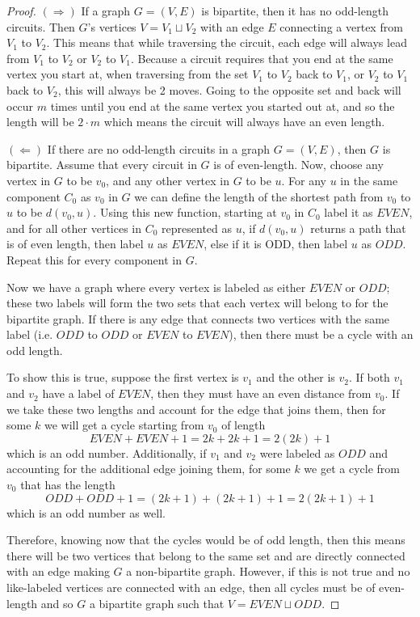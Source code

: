 \documentclass[11pt]{article}
\begin{document}
\begin{proof}
	$(\Longrightarrow)$ If a graph $G=(V,E)$ is bipartite, then it has no odd-length circuits. Then $G$'s vertices $V=V_1 \sqcup V_2$ with an edge $E$ connecting a vertex from $V_1$ to $V_2$. This means that while traversing the circuit, each edge will always lead from $V_1$ to $V_2$ or $V_2$ to $V_1$. Because a circuit requires that you end at the same vertex you start at, when traversing from the set $V_1$ to $V_2$ back to $V_1$, or $V_2$ to $V_1$ back to $V_2$, this will always be 2 moves. Going to the opposite set and back will occur $m$ times until you end at the same vertex you started out at, and so the length will be $2\cdot m$ which means the circuit will always have an even length.

	$(\Longleftarrow)$ If there are no odd-length circuits in a graph $G=(V,E)$, then $G$ is bipartite. Assume that every circuit in $G$ is of even-length. Now, choose any vertex in $G$ to be $v_0$, and any other vertex in $G$ to be $u$. For any $u$ in the same component $C_0$ as $v_0$ in $G$ we can define the length of the shortest path from $v_0$ to $u$ to be $d(v_0,u)$. Using this new function, starting at $v_0$ in $C_0$ label it as $EVEN$, and for all other vertices in $C_0$ represented as $u$, if $d(v_0, u)$ returns a path that is of even length, then label $u$ as $EVEN$, else if it is ODD, then label $u$ as $ODD$. Repeat this for every component in $G$. 

	Now we have a graph where every vertex is labeled as either $EVEN$ or $ODD$; these two labels will form the two sets that each vertex will belong to for the bipartite graph. If there is any edge that connects two vertices with the same label (i.e. $ODD$ to $ODD$ or $EVEN$ to $EVEN$), then there must be a cycle with an odd length. 

	To show this is true, suppose the first vertex is $v_1$ and the other is $v_2$. If both $v_1$ and $v_2$ have a label of $EVEN$, then they must have an even distance from $v_0$. If we take these two lengths and account for the edge that joins them, then for some $k$ we will get a cycle starting from $v_0$ of length $$EVEN+EVEN+1 = 2k + 2k + 1 = 2(2k)+1$$ which is an odd number. Additionally, if $v_1$ and $v_2$ were labeled as $ODD$ and accounting for the additional edge joining them, for some $k$ we get a cycle from $v_0$ that has the length $$ODD + ODD + 1 = (2k+1)+(2k+1)+1 = 2(2k+1)+1$$ which is an odd number as well. 

	Therefore, knowing now that the cycles would be of odd length, then this means there will be two vertices that belong to the same set and are directly connected with an edge making $G$ a non-bipartite graph. However, if this is not true and no like-labeled vertices are connected with an edge, then all cycles must be of even-length and so $G$ a bipartite graph such that $V=EVEN \sqcup ODD$.
\end{proof}
\end{document}
